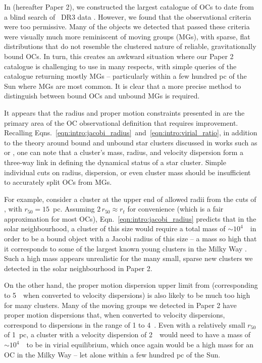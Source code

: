 In \cite{hunt_improving_open_2023} (hereafter Paper 2), we constructed the largest catalogue of OCs to date from a blind search of \gaia\ DR3 data \citep{gaia_collaboration_gaia_2022}. However, we found that the \cite{cantat-gaudin_clusters_2020} observational criteria were too permissive. Many of the objects we detected that passed these criteria were visually much more reminiscent of moving groups (MGs), with sparse, flat distributions that do not resemble the clustered nature of reliable, gravitationally bound OCs. In turn, this creates an awkward situation where our Paper 2 catalogue is challenging to use in many respects, with simple queries of the catalogue returning mostly MGs -- particularly within a few hundred pc of the Sun where MGs are most common. It is clear that a more precise method to distinguish between bound OCs and unbound MGs is required. 

It appears that the radius and proper motion constraints presented in \cite{cantat-gaudin_clusters_2020} are the primary area of the OC observational definition that requires improvement. Recalling Eqns.~\ref{eqn:intro:jacobi_radius}~and~\ref{eqn:intro:virial_ratio}, in addition to the theory around bound and unbound star clusters discussed in works such as \cite{portegies_zwart_young_2010} or \cite{krause_physics_2020}, one can note that a cluster's mass, radius, and velocity dispersion form a three-way link in defining the dynamical status of a star cluster. Simple individual cuts on radius, dispersion, or even cluster mass should be insufficient to accurately split OCs from MGs.

For example, consider a cluster at the upper end of allowed radii from the cuts of \cite{cantat-gaudin_clusters_2020}, with $r_{50}=15$~pc. Assuming $2 \, r_{50}\approx r_t$ for convenience (which is a fair approximation for most OCs), Eqn.~\ref{eqn:intro:jacobi_radius} predicts that in the solar neighbourhood, a cluster of this size would require a total mass of $\sim10^4$~\MSun\ in order to be a bound object with a Jacobi radius of this size -- a mass so high that it corresponds to some of the largest known young clusters in the Milky Way \citep{portegies_zwart_young_2010,cantat-gaudin_milky_2022}. Such a high mass appears unrealistic for the many small, sparse new clusters we detected in the solar neighbourhood in Paper 2. 

On the other hand, the proper motion dispersion upper limit from \cite{cantat-gaudin_clusters_2020} (corresponding to 5~\kms\ when converted to velocity dispersions) is also likely to be much too high for many clusters. Many of the moving groups we detected in Paper 2 have proper motion dispersions that, when converted to velocity dispersions, correspond to dispersions in the range of 1 to 4~\kms. Even with a relatively small $r_{50}$ of 1~pc, a cluster with a velocity dispersion of 2~\kms\ would need to have a mass of $\sim10^4$~\MSun\ to be in virial equilibrium, which once again would be a high mass for an OC in the Milky Way -- let alone within a few hundred pc of the Sun. 

